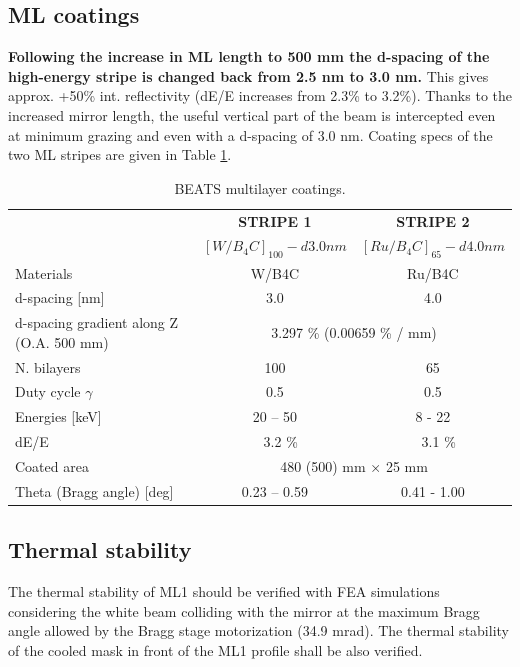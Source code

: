 \subsection{ML coatings}
\textbf{Following the increase in ML length to 500 mm the d-spacing of the high-energy stripe is changed back from 2.5 nm to 3.0 nm.} This gives approx. +50\% int. reflectivity (dE/E increases from 2.3\% to 3.2\%). Thanks to the increased mirror length, the useful vertical part of the beam is intercepted even at minimum grazing and even with a d-spacing of 3.0 nm. Coating specs of the two ML stripes are given in Table \ref{tab:coatings}.
\begin{center}
\begin{table}[h]
\begin{tabular}[bhp]{| l | c | c |}
\hline
 & \textbf{STRIPE 1} & \textbf{STRIPE 2} \\
 & \textbf{$[W/B_{4}C]_{100} - d 3.0 nm $} & \textbf{$[Ru/B_{4}C]_{65} - d 4.0 nm $} \\
\hline
Materials & W/B4C & Ru/B4C \\
d-spacing [nm] & 3.0 & 4.0 \\
d-spacing gradient along Z (O.A. 500 mm) & \multicolumn{2}{c|}{3.297 \% (0.00659 \% / mm)} \\ 
N. bilayers & 100 & 65 \\
Duty cycle $\gamma$ & 0.5 & 0.5 \\
Energies [keV] & 20 – 50 & 8 - 22 \\
dE/E & ~ 3.2 \% & ~ 3.1 \% \\
Coated area & \multicolumn{2}{c|}{480 (500) mm × 25 mm} \\
Theta (Bragg angle) [deg] & 0.23 – 0.59 & 0.41 - 1.00 \\
\hline
\end{tabular}
\caption{\label{tab:coatings} BEATS multilayer coatings.}
\end{table}
\end{center}

\clearpage


% 

\clearpage
\subsection{Thermal stability}
The thermal stability of ML1 should be verified with FEA simulations considering the white beam colliding with the mirror at the maximum Bragg angle allowed by the Bragg stage motorization (34.9 mrad). The thermal stability of the cooled mask in front of the ML1 profile shall be also verified.\\

